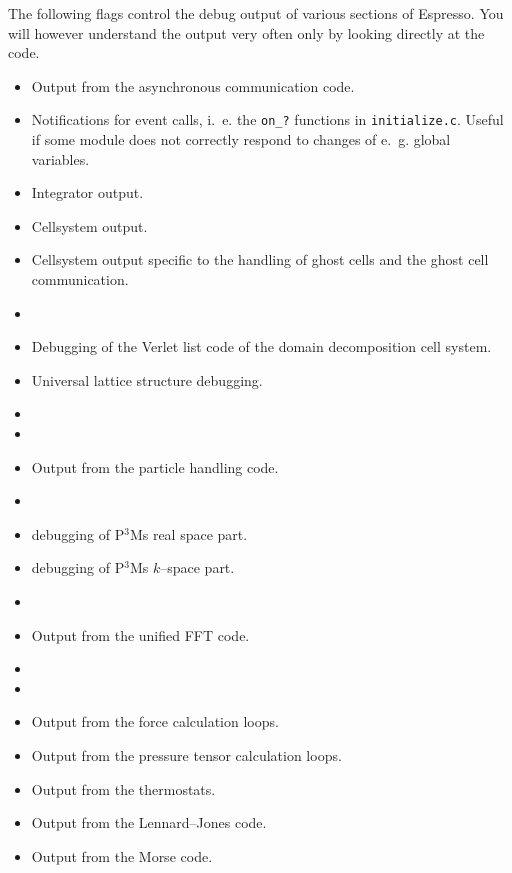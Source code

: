 The following flags control the debug output of various sections of
Espresso. You will however understand the output very often only by
looking directly at the code.
\begin{itemize}
\item {} Output from the asynchronous communication code.
\item {} Notifications for event calls, i.~e. the
  \texttt{on\_?} functions in \texttt{initialize.c}. Useful if some
  module does not correctly respond to changes of e.~g.  global
  variables.
\item {} Integrator output.
\item {} Cellsystem output.
\item {} Cellsystem output specific to the
  handling of ghost cells and the ghost cell communication.
\item {}
\item {} Debugging of the Verlet list code of the
  domain decomposition cell system.
\item {} Universal lattice structure debugging.
\item {}
\item {}
\item {} Output from the particle handling code.
\item {}
\item {} debugging of P$^3$Ms real space part.
\item {} debugging of P$^3$Ms $k$--space part.
\item {}
\item {} Output from the unified FFT code.
\item {}
\item {}
\item {} Output from the force calculation loops.
\item {} Output from the pressure tensor calculation loops.
\item {} Output from the thermostats.
\item {} Output from the Lennard--Jones code.
\item {} Output from the Morse code.

\end{itemize}
